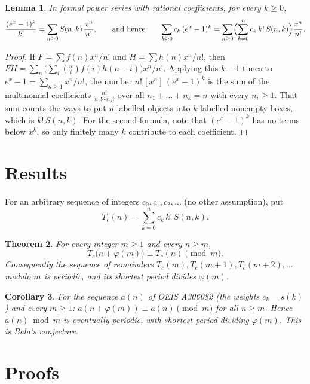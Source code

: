 \documentclass[11pt,a4paper]{article}
\newtheorem{theorem}{Theorem}[section]
\newtheorem{lemma}[theorem]{Lemma}
\newtheorem{corollary}[theorem]{Corollary}
\theoremstyle{definition}
\theoremstyle{remark}
\newcommand{\coeff}[2]{[x^{#1}]\,#2}
\begin{document}
\begin{lemma}\label{lem:egf}
In formal power series with rational coefficients, for every $k\ge0$,
\[
\frac{(e^x-1)^k}{k!}=\sum_{n\ge0}S(n,k)\,\frac{x^n}{n!},
\qquad\text{and hence}\qquad
\sum_{k\ge0}c_k\,(e^x-1)^k=\sum_{n\ge0}\Bigl(\sum_{k=0}^nc_k\,k!\,S(n,k)\Bigr)\frac{x^n}{n!}.
\]
\end{lemma}

\begin{proof}
If $F=\sum f(n)x^n/n!$ and $H=\sum h(n)x^n/n!$, then $FH=\sum_n\bigl(\sum_i\binom ni f(i)h(n-i)\bigr)x^n/n!$. Applying this
$k-1$ times to $e^x-1=\sum_{n\ge1}x^n/n!$, the number $n!\,\coeff{n}{(e^x-1)^k}$ is the sum of the multinomial coefficients
$\frac{n!}{n_1!\cdots n_k!}$ over all $n_1+\dots+n_k=n$ with every $n_i\ge1$. That sum counts the ways to put $n$ labelled
objects into $k$ labelled nonempty boxes, which is $k!\,S(n,k)$. For the second formula, note that $(e^x-1)^k$ has no
terms below $x^k$, so only finitely many $k$ contribute to each coefficient.
\end{proof}


\section{Results}\label{sec:results}

For an arbitrary sequence of integers $c_0,c_1,c_2,\dots$ (no other assumption), put
\begin{equation}\label{eq:transform}
T_c(n)=\sum_{k=0}^{n}c_k\,k!\,S(n,k).
\end{equation}

\begin{theorem}\label{thm:main}
For every integer $m\ge1$ and every $n\ge m$,
\[
T_c\bigl(n+\varphi(m)\bigr)\equiv T_c(n)\pmod m .
\]
Consequently the sequence of remainders $T_c(m),T_c(m+1),T_c(m+2),\dots$ modulo $m$ is periodic, and its shortest period
divides $\varphi(m)$.
\end{theorem}

\begin{corollary}\label{cor:seq}
For the sequence $a(n)$ of OEIS A306082 (the weights $c_k=s(k)$) and every $m\ge1$:
$a(n+\varphi(m))\equiv a(n)\pmod m$ for all $n\ge m$. Hence $a(n)\bmod m$ is eventually periodic, with shortest period
dividing $\varphi(m)$. This is Bala's conjecture.
\end{corollary}

\section{Proofs}\label{sec:proofs}
\end{document}
